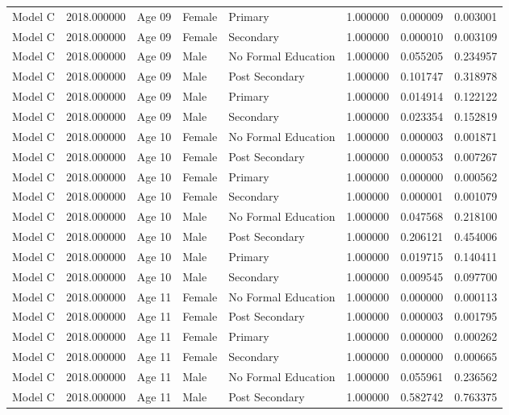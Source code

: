 \begin{table}[ht]
\begin{tabular}{lrlllrrr}
Model C & 2018.000000 & Age 09 & Female & Primary & 1.000000 & 0.000009 & 0.003001 \\
Model C & 2018.000000 & Age 09 & Female & Secondary & 1.000000 & 0.000010 & 0.003109 \\
Model C & 2018.000000 & Age 09 & Male & No Formal Education & 1.000000 & 0.055205 & 0.234957 \\
Model C & 2018.000000 & Age 09 & Male & Post Secondary & 1.000000 & 0.101747 & 0.318978 \\
Model C & 2018.000000 & Age 09 & Male & Primary & 1.000000 & 0.014914 & 0.122122 \\
Model C & 2018.000000 & Age 09 & Male & Secondary & 1.000000 & 0.023354 & 0.152819 \\
Model C & 2018.000000 & Age 10 & Female & No Formal Education & 1.000000 & 0.000003 & 0.001871 \\
Model C & 2018.000000 & Age 10 & Female & Post Secondary & 1.000000 & 0.000053 & 0.007267 \\
Model C & 2018.000000 & Age 10 & Female & Primary & 1.000000 & 0.000000 & 0.000562 \\
Model C & 2018.000000 & Age 10 & Female & Secondary & 1.000000 & 0.000001 & 0.001079 \\
Model C & 2018.000000 & Age 10 & Male & No Formal Education & 1.000000 & 0.047568 & 0.218100 \\
Model C & 2018.000000 & Age 10 & Male & Post Secondary & 1.000000 & 0.206121 & 0.454006 \\
Model C & 2018.000000 & Age 10 & Male & Primary & 1.000000 & 0.019715 & 0.140411 \\
Model C & 2018.000000 & Age 10 & Male & Secondary & 1.000000 & 0.009545 & 0.097700 \\
Model C & 2018.000000 & Age 11 & Female & No Formal Education & 1.000000 & 0.000000 & 0.000113 \\
Model C & 2018.000000 & Age 11 & Female & Post Secondary & 1.000000 & 0.000003 & 0.001795 \\
Model C & 2018.000000 & Age 11 & Female & Primary & 1.000000 & 0.000000 & 0.000262 \\
Model C & 2018.000000 & Age 11 & Female & Secondary & 1.000000 & 0.000000 & 0.000665 \\
Model C & 2018.000000 & Age 11 & Male & No Formal Education & 1.000000 & 0.055961 & 0.236562 \\
Model C & 2018.000000 & Age 11 & Male & Post Secondary & 1.000000 & 0.582742 & 0.763375 \\

\end{tabular}
\end{table}
